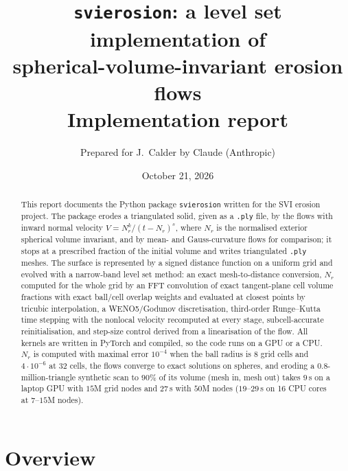 \documentclass[11pt]{article}
\title{\texttt{svierosion}: a level set implementation of\\ spherical-volume-invariant erosion flows\\[4pt]
\large Implementation report}
\author{Prepared for J.\ Calder by Claude (Anthropic)}
\date{October 21, 2026}
\newcommand{\N}{N_r}
\newcommand{\code}[1]{\texttt{#1}}
\begin{document}
\maketitle

\begin{abstract}
This report documents the Python package \code{svierosion} written for the SVI erosion project. The
package erodes a triangulated solid, given as a \code{.ply} file, by the flows with inward normal
velocity $V=\N^k/(t-\N)^s$, where $\N$ is the normalised exterior spherical volume invariant, and by
mean- and Gauss-curvature flows for comparison; it stops at a prescribed fraction of the initial volume
and writes triangulated \code{.ply} meshes. The surface is represented by a signed distance function
on a uniform grid and evolved with a narrow-band level set method: an exact mesh-to-distance
conversion, $\N$ computed for the whole grid by an FFT convolution of exact tangent-plane cell volume
fractions with exact ball/cell overlap weights and evaluated at closest points by tricubic
interpolation, a WENO5/Godunov discretisation, third-order Runge--Kutta time stepping with the nonlocal
velocity recomputed at every stage, subcell-accurate reinitialisation, and step-size control derived from
a linearisation of the flow. All kernels are written in PyTorch and compiled, so the code runs on a GPU
or a CPU. $\N$ is computed with maximal error $10^{-4}$ when the ball radius is $8$ grid cells and
$4\cdot10^{-6}$ at $32$ cells, the flows converge to exact solutions on spheres, and eroding a
$0.8$-million-triangle synthetic scan to $90\%$ of its volume (mesh in, mesh out) takes $9$\,s on a
laptop GPU with $15$M grid nodes and $27$\,s with $50$M nodes ($19$--$29$\,s on 16 CPU cores at
$7$--$15$M nodes).
\end{abstract}

\tableofcontents

\section{Overview}
\end{document}
